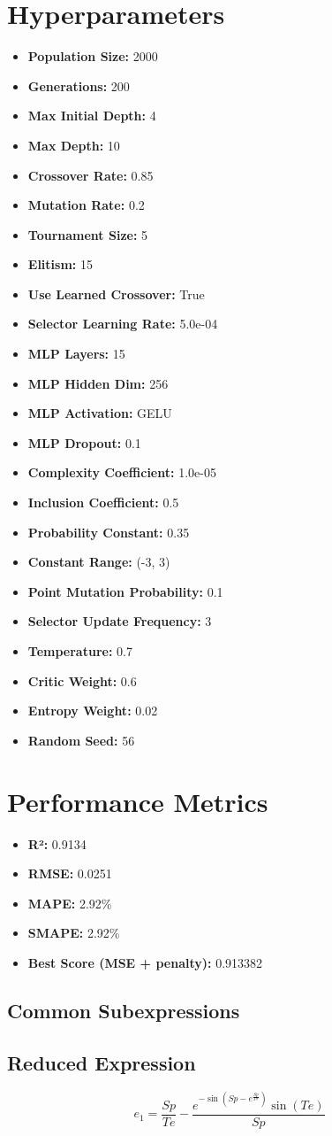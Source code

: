 \documentclass{article}
\begin{document}
\section*{Hyperparameters}
\begin{itemize}
\item \textbf{Population Size:} 2000
\item \textbf{Generations:} 200
\item \textbf{Max Initial Depth:} 4
\item \textbf{Max Depth:} 10
\item \textbf{Crossover Rate:} 0.85
\item \textbf{Mutation Rate:} 0.2
\item \textbf{Tournament Size:} 5
\item \textbf{Elitism:} 15
\item \textbf{Use Learned Crossover:} True
\item \textbf{Selector Learning Rate:} 5.0e-04
\item \textbf{MLP Layers:} 15
\item \textbf{MLP Hidden Dim:} 256
\item \textbf{MLP Activation:} GELU
\item \textbf{MLP Dropout:} 0.1
\item \textbf{Complexity Coefficient:} 1.0e-05
\item \textbf{Inclusion Coefficient:} 0.5
\item \textbf{Probability Constant:} 0.35
\item \textbf{Constant Range:} (-3, 3)
\item \textbf{Point Mutation Probability:} 0.1
\item \textbf{Selector Update Frequency:} 3
\item \textbf{Temperature:} 0.7
\item \textbf{Critic Weight:} 0.6
\item \textbf{Entropy Weight:} 0.02
\item \textbf{Random Seed:} 56
\end{itemize}
\section*{Performance Metrics}
\begin{itemize}
\item \textbf{R²:} 0.9134
\item \textbf{RMSE:} 0.0251
\item \textbf{MAPE:} 2.92\%
\item \textbf{SMAPE:} 2.92\%
\item \textbf{Best Score (MSE + penalty):} 0.913382
\end{itemize}
\begin{landscape}
\subsection*{Common Subexpressions}
\vspace{1em}
\newpage
\end{landscape}
\subsection*{Reduced Expression}
\begin{landscape}
\begin{dmath*}
e_{1} = \frac{Sp}{Te} - \frac{e^{- \sin{\left(Sp - e^{\frac{Sp}{Pr}} \right)}} \sin{\left(Te \right)}}{Sp}
\end{dmath*}
\end{landscape}
\end{document}
